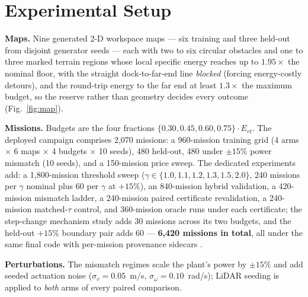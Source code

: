 \documentclass[preprint,12pt]{elsarticle}
\begin{document}
\section{Experimental Setup}
\label{sec:setup}

\textbf{Maps.} Nine generated 2-D workspace maps --- six training and
three held-out from disjoint generator seeds --- each with two to six
circular obstacles and one to three marked terrain regions whose
local specific energy reaches up to $1.95\times$ the nominal floor,
with the straight
dock-to-far-end line \emph{blocked} (forcing energy-costly detours),
and the round-trip energy to the far end at least $1.3\times$ the
maximum budget, so the reserve rather than geometry decides every
outcome
(Fig.~\ref{fig:map}).

\textbf{Missions.} Budgets are the four fractions
$\{0.30, 0.45, 0.60, 0.75\}\cdot E_{rt}$. The deployed campaign
comprises 2{,}070 missions: a 960-mission training grid (4 arms
$\times$ 6 maps $\times$ 4 budgets $\times$ 10 seeds), 480 held-out,
480 under $\pm 15\%$ power mismatch (10 seeds), and a 150-mission
price sweep. The dedicated experiments add: a 1{,}800-mission
threshold sweep ($\gamma \in \{1.0, 1.1, 1.2, 1.3, 1.5, 2.0\}$,
240 missions per $\gamma$ nominal plus 60 per $\gamma$ at $+15\%$),
an 840-mission hybrid validation, a 420-mission mismatch ladder, a
240-mission paired certificate revalidation, a 240-mission
matched-$\tau$ control, and 360-mission oracle runs under each
certificate; the step-change mechanism study adds 30 missions across
its two budgets, and the held-out $+15\%$ boundary pair adds 60 ---
\textbf{6{,}420 missions in total}, all under the same final
code with per-mission provenance sidecars
.

\textbf{Perturbations.} The mismatch regimes scale the plant's power
by $\pm 15\%$ and add seeded actuation noise
($\sigma_v = 0.05$~m/s, $\sigma_\omega = 0.10$~rad/s); LiDAR seeding
is applied to \emph{both} arms of every paired comparison.
\end{document}
